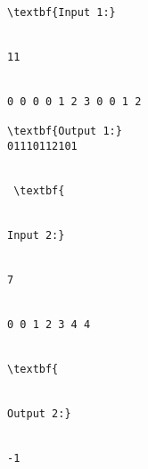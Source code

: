 \begin{verbatim}
\textbf{Input 1:}


11


0 0 0 0 1 2 3 0 0 1 2

\textbf{Output 1:}
01110112101


 \textbf{


Input 2:}


7


0 0 1 2 3 4 4


\textbf{


Output 2:}


-1\end{verbatim}